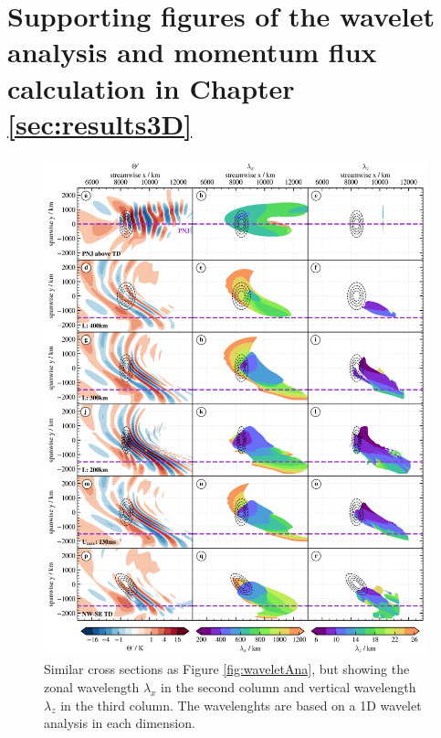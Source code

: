 \chapter{Supporting figures of the wavelet analysis and momentum flux calculation in Chapter \ref{sec:results3D}}
\label{appA}
\thispagestyle{plain}
%
\begin{figure}[tbp]
    \centering
    \includegraphics[width=0.99\textwidth]{figures_3D/waveletAna_overview.png}
    \caption{Similar cross sections as Figure \ref{fig:waveletAna}, but showing the zonal wavelength $\lambda_x$ in the second column and vertical wavelength $\lambda_z$ in the third column. The wavelenghts are based on a 1D wavelet analysis in each dimension.}
    \label{fig:waveletAna_xz}
\end{figure}
%
